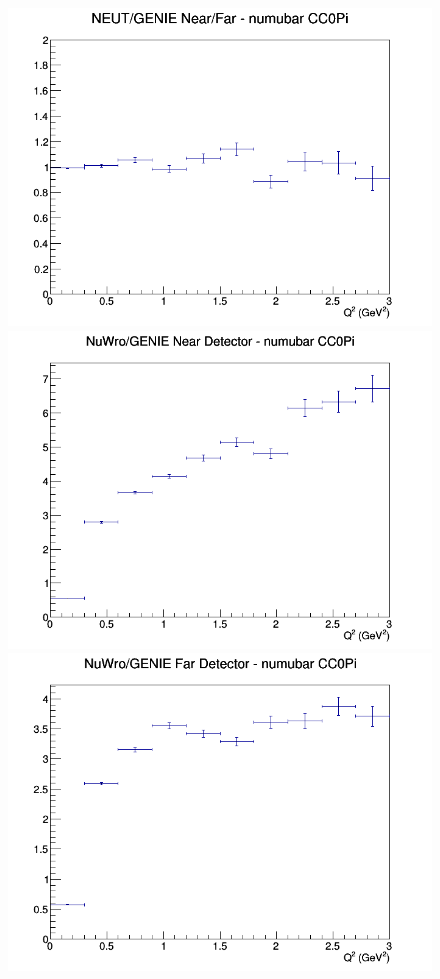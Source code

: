 \documentclass[12pt]{article}
\begin{document}
\begin{figure}[h]
\endminipage
{}
\includegraphics[width=\linewidth]{eff_Q2/LAr/ratios/CC0Pi_NEUT_GENIE_numubar_NF_Q2.png}
\endminipage
\newline
{}
\includegraphics[width=\linewidth]{eff_Q2/LAr/ratios/CC0Pi_NuWro_GENIE_numubar_near_Q2.png}
\endminipage
{}
\includegraphics[width=\linewidth]{eff_Q2/LAr/ratios/CC0Pi_NuWro_GENIE_numubar_far_Q2.png}

\end{figure}
\end{document}
